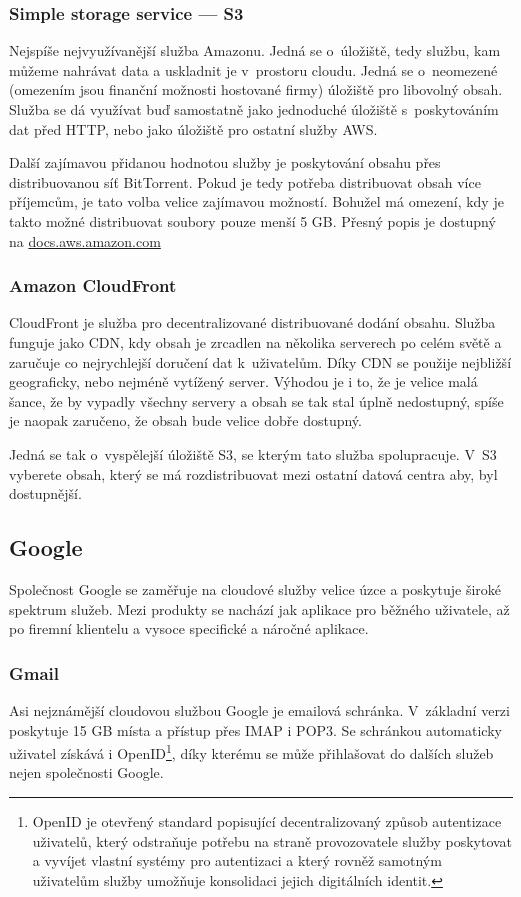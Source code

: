 \subsubsection{Simple storage service --- S3}
Nejspíše nejvyužívanější služba Amazonu. Jedná se o~úložiště, tedy službu, kam můžeme nahrávat data a uskladnit je v~prostoru cloudu. Jedná se o~neomezené (omezením jsou finanční možnosti hostované firmy) úložiště pro libovolný obsah. Služba se dá využívat buď samostatně jako jednoduché úložiště s~poskytováním dat před HTTP, nebo jako úložiště pro ostatní služby AWS.

Další zajímavou přidanou hodnotou služby je poskytování obsahu přes distribuovanou síť BitTorrent. Pokud je tedy potřeba distribuovat obsah více příjemcům, je tato volba velice zajímavou možností. Bohužel má omezení, kdy je takto možné distribuovat soubory pouze menší 5 GB. Přesný popis je dostupný na \href{http://docs.aws.amazon.com/AmazonS3/latest/dev/S3Torrent.html}{docs.aws.amazon.com}

\subsubsection{Amazon CloudFront}
CloudFront je služba pro decentralizované distribuované dodání obsahu. Služba funguje jako CDN, kdy obsah je zrcadlen na několika serverech po celém světě a zaručuje co nejrychlejší doručení dat k~uživatelům. Díky CDN se použije nejbližší geograficky, nebo nejméně vytížený server. Výhodou je i to, že je velice malá šance, že by vypadly všechny servery a obsah se tak stal úplně nedostupný, spíše je naopak zaručeno, že obsah bude velice dobře dostupný.

Jedná se tak o~vyspělejší úložiště S3, se kterým tato služba spolupracuje. V~S3 vyberete obsah, který se má rozdistribuovat mezi ostatní datová centra aby, byl dostupnější.

\subsection{Google}
Společnost Google se zaměřuje na cloudové služby velice úzce a poskytuje široké spektrum služeb. Mezi produkty se nachází jak aplikace pro běžného uživatele, až po firemní klientelu a vysoce specifické a náročné aplikace.

\subsubsection{Gmail}
Asi nejznámější cloudovou službou Google je emailová schránka. V~základní verzi poskytuje 15 GB místa a přístup přes IMAP i POP3. Se schránkou automaticky uživatel získává i OpenID\footnote{OpenID je otevřený standard popisující decentralizovaný způsob autentizace uživatelů, který odstraňuje potřebu na straně provozovatele služby poskytovat a vyvíjet vlastní systémy pro autentizaci a který rovněž samotným uživatelům služby umožňuje konsolidaci jejich digitálních identit.\cite{wiki:openID}}, díky kterému se může přihlašovat do dalších služeb nejen společnosti Google.

